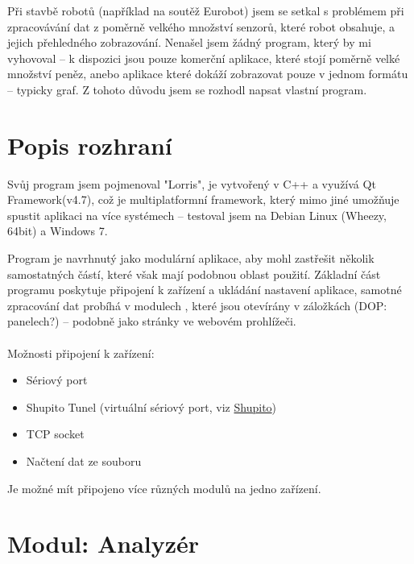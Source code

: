 \documentclass[12pt, a4paper, oneside]{article}
\begin{document}
Při stavbě robotů (například na soutěž Eurobot) jsem se setkal s problémem  při zpracovávání dat z poměrně velkého množství senzorů, které robot obsahuje, a jejich přehledného zobrazování. Nenašel jsem žádný program, který by mi vyhovoval -- k dispozici jsou pouze komerční aplikace, které stojí poměrně velké množství peněz, anebo aplikace které dokáží zobrazovat pouze v jednom formátu -- typicky graf. Z tohoto důvodu jsem se rozhodl napsat vlastní program.

\section*{Popis rozhraní}
Svůj program jsem pojmenoval "Lorris", je vytvořený v C++ a využívá Qt Framework(v4.7)\cite{qtfw}, což je multiplatformní framework, který mimo jiné umožňuje spustit aplikaci na více systémech -- testoval jsem na Debian Linux (Wheezy, 64bit) a Windows 7.  

Program je navrhnutý jako modulární aplikace, aby mohl zastřešit několik samostatných částí, které však mají podobnou oblast použití. Základní část programu poskytuje připojení k zařízení a ukládání nastavení aplikace, samotné zpracování dat probíhá v modulech
, které jsou otevírány v záložkách (DOP: panelech?) -- podobně jako stránky ve webovém prohlížeči.\\
\\
Možnosti připojení k zařízení:
\begin{itemize}
    \item Sériový port
    \item Shupito Tunel (virtuální sériový port, viz \hyperref[tunel]{Shupito})
    \item TCP socket\cite{tcp_sock}
    \item Načtení dat ze souboru
\end{itemize}
Je možné mít připojeno více různých modulů na jedno zařízení.  

\newpage
\section*{Modul: Analyzér}
\end{document}
